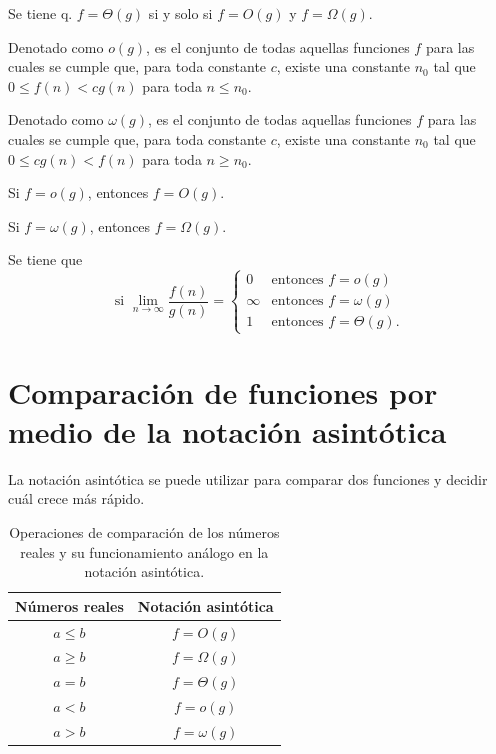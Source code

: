 \begin{prop}
  Se tiene q. \(f=\Theta(g)\) si y solo si \(f=O(g)\) y \(f=\Omega(g)\).
\end{prop}

\begin{defn}
  Denotado como \(o(g)\), es el conjunto de todas aquellas funciones \(f\) para las cuales se cumple que, para toda constante \(c\), existe una constante \(n_0\) tal que \(0\leq f(n)<cg(n)\) para toda \(n\leq n_0\).
\end{defn}

\begin{defn}
  Denotado como \(\omega(g)\), es el conjunto de todas aquellas funciones \(f\) para las cuales se cumple que, para toda constante \(c\), existe una constante \(n_0\) tal que \(0\leq cg(n)<f(n)\) para toda \(n\geq n_0\).
\end{defn}

\begin{prop}
  Si \(f=o(g)\), entonces \(f=O(g)\).
\end{prop}

\begin{prop}
  Si \(f=\omega(g)\), entonces \(f=\Omega(g)\).
\end{prop}

\begin{prop}
  Se tiene que
  \[
    \text{si }\lim_{n\to\infty}\dfrac{f(n)}{g(n)}=\begin{cases}
    0 & \text{entonces }f=o(g)\\
    \infty & \text{entonces }f=\omega(g)\\
    1 & \text{entonces }f=\Theta(g).
    \end{cases}
  \]
\end{prop}

\newpage
\section{Comparación de funciones por medio de la notación asintótica}

La notación asintótica se puede utilizar para comparar dos funciones y decidir cuál crece más rápido.

\begin{table}
  \label{tab:func-comp}
  \caption{Operaciones de comparación de los números reales y su funcionamiento análogo en la notación asintótica.}
  \centering
  \begin{tabular}{cc}
    \toprule 
      Números reales & Notación asintótica\tabularnewline
    \midrule
      \(a\leq b\) & \(f=O(g)\)\tabularnewline
      \(a\ge b\) & \(f=\Omega(g)\)\tabularnewline
      \(a=b\) & \(f=\Theta(g)\)\tabularnewline
      \(a<b\) & \(f=o(g)\)\tabularnewline
      \(a>b\) & \(f=\omega(g)\)\tabularnewline
    \bottomrule
  \end{tabular}
\end{table}

